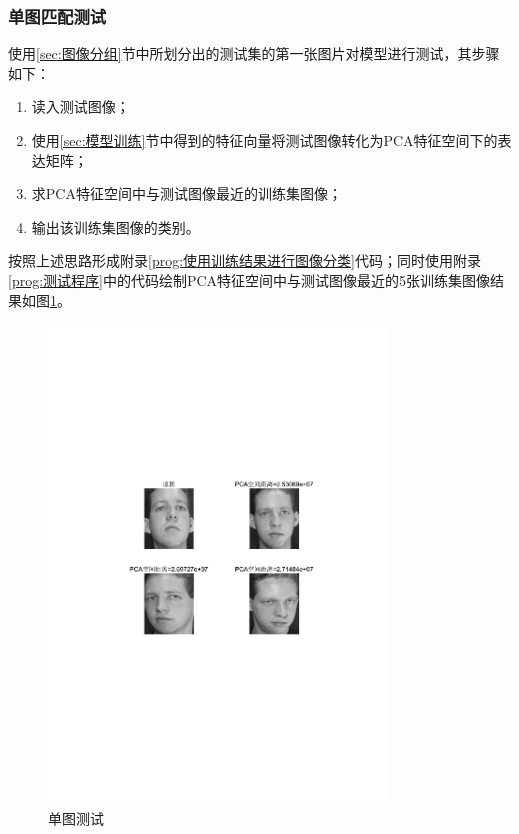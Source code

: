 \documentclass[a4paper]{ctexart}
\begin{document}
\subsubsection{单图匹配测试}\label{sec:单图匹配测试}
使用\ref{sec:图像分组}节中所划分出的测试集的第一张图片对模型进行测试，其步骤如下：
\begin{enumerate}[label=\arabic*、]
	\item 读入测试图像；
	\item 使用\ref{sec:模型训练}节中得到的特征向量将测试图像转化为PCA特征空间下的表达矩阵；
	\item 求PCA特征空间中与测试图像最近的训练集图像；
	\item 输出该训练集图像的类别。
\end{enumerate}
按照上述思路形成附录\ref{prog:使用训练结果进行图像分类}代码；同时使用附录\ref{prog:测试程序}中的代码绘制PCA特征空间中与测试图像最近的5张训练集图像结果如图\ref{figure:单图测试}。
\begin{figure}[htbp]
	\centering
	\includegraphics[width=0.8\textwidth]{figure/2.pdf}
	\caption{单图测试}\label{figure:单图测试}
\end{figure}
\end{document}
